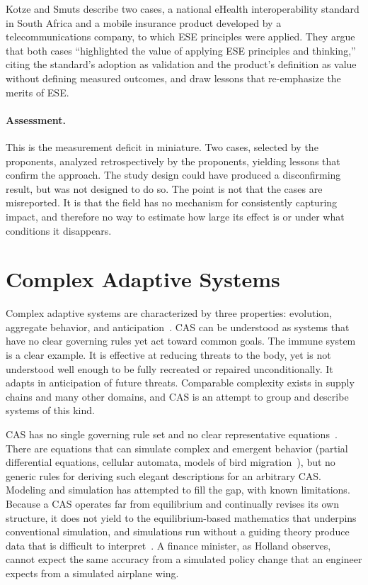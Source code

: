 \documentclass{csimq}
\begin{document}
Kotze and Smuts describe two cases, a national eHealth interoperability standard in South Africa and a mobile insurance product developed by a telecommunications company, to which ESE principles were applied. They argue that both cases ``highlighted the value of applying ESE principles and thinking,'' citing the standard's adoption as validation and the product's definition as value without defining measured outcomes, and draw lessons that re-emphasize the merits of ESE.

\paragraph{Assessment.} This is the measurement deficit in miniature. Two
cases, selected by the proponents, analyzed retrospectively by the proponents,
yielding lessons that confirm the approach. The study design could
have produced a disconfirming result, but was not designed to do so. The point is not that the cases are
misreported. It is that the field has no mechanism for consistently capturing impact, and therefore no way to estimate how large its
effect is or under what conditions it disappears.

\section{Complex Adaptive Systems}
\label{sec:cas}

Complex adaptive systems are characterized by three properties: evolution,
aggregate behavior, and anticipation~\cite{holland1992}. CAS can be understood
as systems that have no clear governing rules yet act toward common goals. The
immune system is a clear example. It is effective at reducing threats to
the body, yet is not understood well enough to be fully recreated or repaired
unconditionally. It adapts in anticipation of future threats. Comparable
complexity exists in supply chains and many other domains, and CAS is an attempt
to group and describe systems of this kind.

CAS has no single governing rule set and no clear representative equations~\cite{holland1992}. There are equations that can simulate complex and emergent behavior (partial differential equations, cellular automata, models of bird migration~\cite{stevens2021}), but no generic rules for deriving such elegant descriptions for an arbitrary CAS. Modeling and simulation has attempted to fill the gap, with known limitations. Because a CAS operates far from equilibrium and continually revises its own structure, it does not yield to the equilibrium-based mathematics that underpins conventional simulation, and simulations run without a guiding theory produce data that is difficult to interpret~\cite{holland1992}. A finance minister, as Holland observes, cannot expect the same accuracy from a simulated policy change that an engineer expects from a simulated airplane wing.
\end{document}
